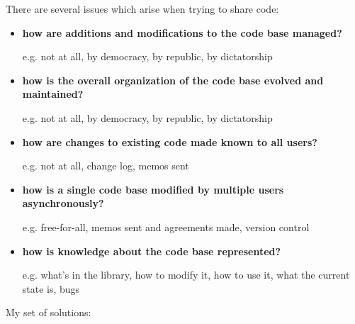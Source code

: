 There are several issues which arise when trying to share code:

\begin{itemize}
\item {\bf how are additions and modifications to the code base managed?}

		e.g. not at all, by democracy, by republic, by dictatorship
\item {\bf how is the overall organization of the code base evolved and 
	maintained?}

		e.g. not at all, by democracy, by republic, by dictatorship
\item {\bf how are changes to existing code made known to all users?}

		e.g. not at all, change log, memos sent
\item {\bf how is a single code base modified by multiple users asynchronously?}

		e.g. free-for-all, memos sent and agreements made, version control
\item {\bf how is knowledge about the code base represented?}

		e.g. what's in the library, how to modify it, how to use it, what the
			current state is, bugs
\end{itemize}

\pagebreak
My set of solutions:

